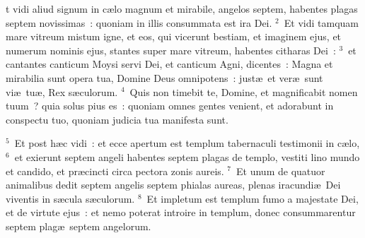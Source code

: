 \bchapter
{}t vidi aliud signum in c\ae lo magnum et mirabile, angelos septem, habentes plagas septem novissimas~: quoniam in illis consummata est ira Dei.
${}^{2}$~Et vidi tamquam mare vitreum mistum igne, et eos, qui vicerunt bestiam, et imaginem ejus, et numerum nominis ejus, stantes super mare vitreum, habentes citharas Dei~:
${}^{3}$~et cantantes canticum Moysi servi Dei, et canticum Agni, dicentes~: Magna et mirabilia sunt opera tua, Domine Deus omnipotens~: just\ae\ et ver\ae\ sunt vi\ae\ tu\ae , Rex s\ae culorum.
${}^{4}$~Quis non timebit te, Domine, et magnificabit nomen tuum~? quia solus pius es~: quoniam omnes gentes venient, et adorabunt in conspectu tuo, quoniam judicia tua manifesta sunt.


${}^{5}$~Et post h\ae c vidi~: et ecce apertum est templum tabernaculi testimonii in c\ae lo,
${}^{6}$~et exierunt septem angeli habentes septem plagas de templo, vestiti lino mundo et candido, et pr\ae cincti circa pectora zonis aureis.
${}^{7}$~Et unum de quatuor animalibus dedit septem angelis septem phialas aureas, plenas iracundi\ae\ Dei viventis in s\ae cula s\ae culorum.
${}^{8}$~Et impletum est templum fumo a majestate Dei, et de virtute ejus~: et nemo poterat introire in templum, donec consummarentur septem plag\ae\ septem angelorum.

